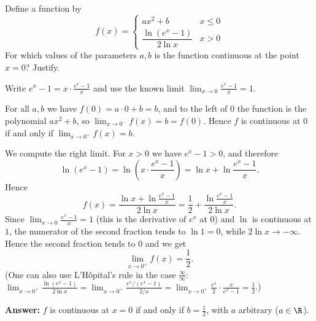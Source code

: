 
\begin{question}
Define a function by
\[ f(x) = \begin{cases} ax^2 + b & x \le 0 \\ \dfrac{\ln(e^x - 1)}{2\ln x} & x > 0 \end{cases} \]
For which values of the parameters $a, b$ is the function continuous at the point $x=0$? Justify.
\end{question}

\begin{hint}
Write $e^x - 1 = x \cdot \frac{e^x - 1}{x}$ and use the known limit $\lim_{x\to 0}\frac{e^x-1}{x} = 1$.
\end{hint}

\begin{solution}
For all $a,b$ we have $f(0) = a\cdot 0 + b = b$, and to the left of $0$ the function is the polynomial $ax^2+b$, so
$\lim_{x\to 0^-} f(x) = b = f(0)$. Hence $f$ is continuous at $0$ if and only if $\lim_{x\to 0^+} f(x) = b$.

We compute the right limit. For $x>0$ we have $e^x - 1 > 0$, and therefore
\[ \ln(e^x - 1) = \ln\left( x \cdot \frac{e^x-1}{x} \right) = \ln x + \ln\frac{e^x - 1}{x}. \]
Hence
\[ f(x) = \frac{\ln x + \ln\frac{e^x-1}{x}}{2\ln x} = \frac12 + \frac{\ln\frac{e^x-1}{x}}{2\ln x}. \]
Since $\lim_{x\to 0}\frac{e^x - 1}{x} = 1$ (this is the derivative of $e^x$ at $0$) and $\ln$ is continuous at $1$, the numerator of the second fraction tends to $\ln 1 = 0$,
while $2\ln x \to -\infty$. Hence the second fraction tends to $0$ and we get
\[ \lim_{x\to 0^+} f(x) = \frac12. \]
(One can also use L'Hôpital's rule in the case $\frac{\infty}{\infty}$:
$\lim_{x\to0^+}\frac{\ln(e^x-1)}{2\ln x} = \lim_{x\to0^+}\frac{e^x/(e^x-1)}{2/x} = \lim_{x\to 0^+}\frac{e^x}{2}\cdot\frac{x}{e^x-1} = \frac12$.)

\textbf{Answer:} $f$ is continuous at $x=0$ if and only if $b = \frac12$, with $a$ arbitrary ($a \in \R$).
\end{solution}
